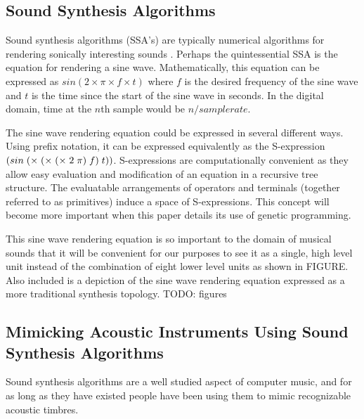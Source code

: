 \documentclass[12pt]{article}
\begin{document}
\subsection{Sound Synthesis Algorithms}\label{SSA}
Sound synthesis algorithms (SSA's) are typically numerical algorithms for rendering sonically interesting sounds \citep{tolonen1998evaluation}. Perhaps the quintessential SSA is the equation for rendering a sine wave. Mathematically, this equation can be expressed as $sin (2 \times \pi \times f \times t)$ where $f$ is the desired frequency of the sine wave and $t$ is the time since the start of the sine wave in seconds. In the digital domain, time at the $n$th sample would be $n/sample rate$.
	
The sine wave rendering equation could be expressed in several different ways. Using prefix notation, it can be expressed equivalently as the S-expression $\sexp{({sin} (\times (\times (\times 2 \pi) f) t))}$. S-expressions are computationally convenient as they allow easy evaluation and modification of an equation in a recursive tree structure. The evaluatable arrangements of operators and terminals (together referred to as primitives) induce a space of S-expressions. This concept will become more important when this paper details its use of genetic programming.
	
This sine wave rendering equation is so important to the domain of musical sounds that it will be convenient for our purposes to see it as a single, high level unit instead of the combination of eight lower level units as shown in FIGURE. Also included is a depiction of the sine wave rendering equation expressed as a more traditional synthesis topology. TODO: figures
	
\subsection{Mimicking Acoustic Instruments Using Sound Synthesis Algorithms}
Sound synthesis algorithms are a well studied aspect of computer music, and for as long as they have existed people have been using them to mimic recognizable acoustic timbres.
\end{document}
